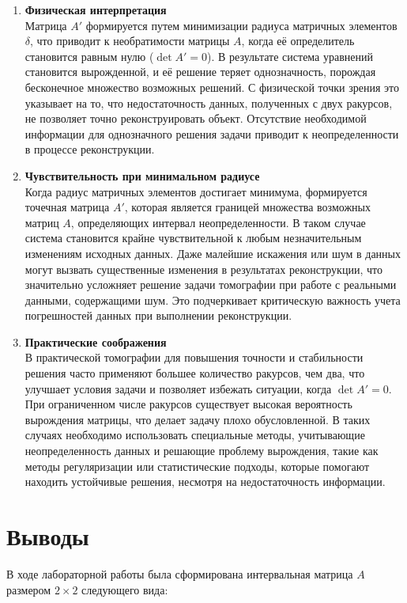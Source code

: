 \documentclass[a4paper,14pt]{article}
\begin{document}
	\begin{enumerate}
		\item \textbf{Физическая интерпретация} \\
Матрица \( A' \) формируется путем минимизации радиуса матричных элементов \( \delta \), что приводит к необратимости матрицы \( A \), когда её определитель становится равным нулю (\( \det A' = 0 \)). В результате система уравнений становится вырожденной, и её решение теряет однозначность, порождая бесконечное множество возможных решений. С физической точки зрения это указывает на то, что недостаточность данных, полученных с двух ракурсов, не позволяет точно реконструировать объект. Отсутствие необходимой информации для однозначного решения задачи приводит к неопределенности в процессе реконструкции.
		\item \textbf{Чувствительность при минимальном радиусе} \\
Когда радиус матричных элементов достигает минимума, формируется точечная матрица \( A' \), которая является границей множества возможных матриц \( A \), определяющих интервал неопределенности. В таком случае система становится крайне чувствительной к любым незначительным изменениям исходных данных. Даже малейшие искажения или шум в данных могут вызвать существенные изменения в результатах реконструкции, что значительно усложняет решение задачи томографии при работе с реальными данными, содержащими шум. Это подчеркивает критическую важность учета погрешностей данных при выполнении реконструкции.
	
		\item \textbf{Практические соображения} \\
В практической томографии для повышения точности и стабильности решения часто применяют большее количество ракурсов, чем два, что улучшает условия задачи и позволяет избежать ситуации, когда \( \det A' = 0 \). При ограниченном числе ракурсов существует высокая вероятность вырождения матрицы, что делает задачу плохо обусловленной. В таких случаях необходимо использовать специальные методы, учитывающие неопределенность данных и решающие проблему вырождения, такие как методы регуляризации или статистические подходы, которые помогают находить устойчивые решения, несмотря на недостаточность информации.
	\end{enumerate}

	\section{Выводы}
В ходе лабораторной работы была сформирована интервальная матрица \(A\) размером \(2 \times 2\) следующего вида:
\end{document}

